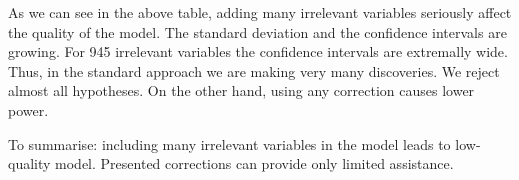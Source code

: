 \documentclass[
]{article}
\begin{document}
As we can see in the above table, adding many irrelevant variables
seriously affect the quality of the model. The standard deviation and
the confidence intervals are growing. For 945 irrelevant variables the
confidence intervals are extremally wide. Thus, in the standard approach
we are making very many discoveries. We reject almost all hypotheses. On
the other hand, using any correction causes lower power.

To summarise: including many irrelevant variables in the model leads to
low-quality model. Presented corrections can provide only limited
assistance.
\end{document}
